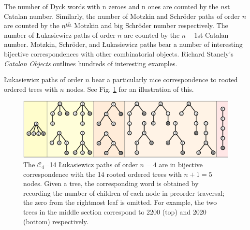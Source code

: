 The number of Dyck words with n zeroes and n ones are counted by the $n$st Catalan number.  Similarly, the number of Motzkin and Schröder paths of order $n$ are counted by the $n^{\underline{th}}$ Motzkin and big Schröder number respectively. The number of Łukasiewicz paths of order $n$ are counted by the $n-1$st Catalan number. %
Motzkin, Schröder, and Łukasiewicz paths bear a number of interesting bijective correspondences with other combinatorial objects. Richard Stanely's \emph{Catalan Objects} outlines hundreds of interesting examples.  

Łukasiewicz paths  of order $n$ bear a particularly nice correspondence to rooted ordered trees with $n$ nodes. See Fig. \ref{trees} for an illustration of this.

\begin{figure}[]
	\centering
	\includegraphics[width = .95 \textwidth]{trees.png}
	\caption{The $\mathcal{C}_4$=14 Łukasiewicz paths of order $n=4$ are in bijective correspondence with the 14 rooted ordered trees with $n+1=5$ nodes.  Given a tree, the corresponding word is obtained by recording the number of children of each node in preorder traversal; the zero from the rightmost leaf is omitted.  For example, the two trees in the middle section correspond to 2200 (top) and 2020 (bottom) respectively.}
	\label{trees}
\end{figure}


